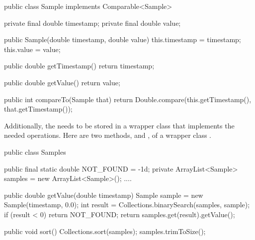 \begin{shortlisting}
   
    public class Sample implements Comparable<Sample> {

        private final double timestamp;
        private final double value;
	
        public Sample(double timestamp, double value) {
            this.timestamp = timestamp;
            this.value = value;
        }
	
        public double getTimestamp() {
            return timestamp;
        }
	
        public double getValue() {
            return value;
        }
	      
        public int compareTo(Sample that) {
            return Double.compare(this.getTimestamp(), that.getTimestamp());	
        }
    }

\end{shortlisting}

Additionally, the  needs to be stored in a wrapper class that
implements the needed operations. Here are two methods,  and
, of a wrapper class .

\begin{shortlisting}
    public class Samples {
    
    	public final static double NOT_FOUND = -1d;
        private ArrayList<Sample> samples = 
        	new ArrayList<Sample>();
        ....
		
        public double getValue(double timestamp) {
            Sample sample = new Sample(timestamp, 0.0);
            int result = 
            	Collections.binarySearch(samples, sample);
            if (result < 0) {
                return NOT_FOUND;
            }
            return samples.get(result).getValue();
        }
		
        public void sort() {
            Collections.sort(samples);
            samples.trimToSize();	
        }
    }
    
\end{shortlisting}
  
